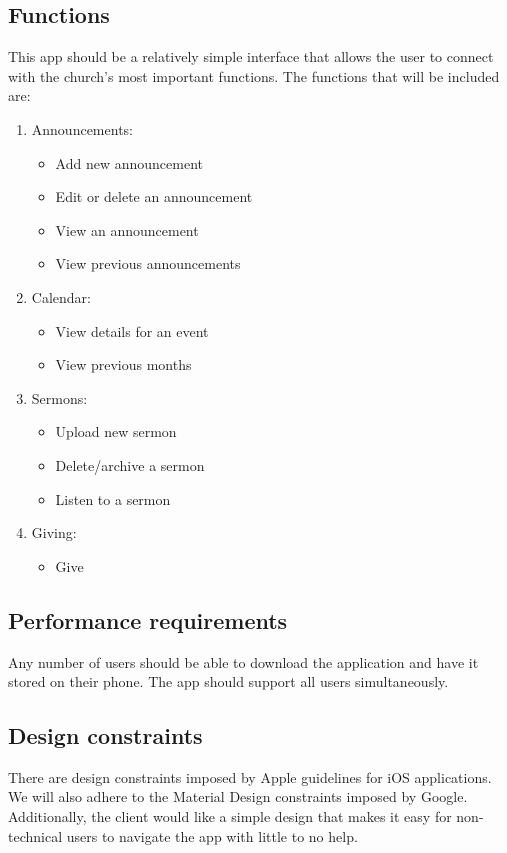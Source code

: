 \documentclass[letterpaper,10pt,draftclsnofoot,onecolumn,compsoc,titlepage]{IEEEtran}
\begin{document}
	\subsection{Functions}
	This app should be a relatively simple interface that allows the user to connect with the church's most important functions.
	The functions that will be included are:
	\begin{enumerate}
		\item{Announcements:}
			\begin{itemize}
				\item{Add new announcement}
				\item{Edit or delete an announcement}
				\item{View an announcement}
				\item{View previous announcements}
			\end{itemize}
		\item{Calendar:}
			\begin{itemize}
				\item{View details for an event}
				\item{View previous months}
			\end{itemize}
		\item{Sermons:}
			\begin{itemize}
				\item{Upload new sermon}
				\item{Delete/archive a sermon}
				\item{Listen to a sermon}
			\end{itemize}
		\item{Giving:}
			\begin{itemize}
				\item{Give}
			\end{itemize}
	\end{enumerate}

	\subsection{Performance requirements}
	Any number of users should be able to download the application and have it stored on their phone.
	The app should support all users simultaneously.

	\subsection{Design constraints}
	There are design constraints imposed by Apple guidelines for iOS applications.
	We will also adhere to the Material Design constraints imposed by Google.
	Additionally, the client would like a simple design that makes it easy for non-technical users to navigate the app with little to no help.
\end{document}
